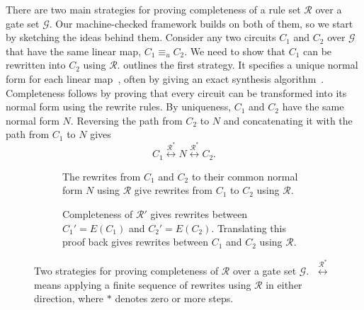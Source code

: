 \documentclass[acmsmall,nonacm,11pt,screen]{acmart}
\newcommand{\tikzfig}[1]{{\tikzstyle{every picture}=[tikzfig]}}
\newcommand{\rewrites}[1]{\overset{#1^{*}}{\longleftrightarrow}}
\begin{document}
There are two main strategies for proving completeness of a rule set $\mathcal{R}$ over a gate set $\mathcal{G}$. Our machine-checked framework builds on both of them, so we start by sketching the ideas behind them. Consider any two circuits $C_1$ and $C_2$ over $\mathcal{G}$ that have the same linear map, $C_1\equiv_{u}C_2$. We need to show that $C_1$ can be rewritten into $C_2$ using $\mathcal{R}$.  outlines the first strategy. It specifies a unique normal form for each linear map~\cite{lafont2003boolean,sakashita2013cnot,feng2026complete,feng2026ancillas,selinger2015clifford,bian2026qupit,makary2021real,amy2018cnotdihedral,blake2026phaseaffine,li2025qutrit}, often by giving an exact synthesis algorithm~\cite{greylyn2014,bian2021un,li2021on,fang2026hadamard,clement2019thesis}. Completeness follows by proving that every circuit can be transformed into its normal form using the rewrite rules. By uniqueness, $C_1$ and $C_2$ have the same normal form $N$. Reversing the path from $C_2$ to $N$ and concatenating it with the path from $C_1$ to $N$ gives
\[
C_1\rewrites{\mathcal{R}}N\rewrites{\mathcal{R}}C_2.
\]

\vspace{-.2 cm}

\begin{figure}[H]
\centering
\begin{subfigure}[b]{0.42\linewidth}
  \centering
  \scalebox{.8}{\tikzfig{planqc/figures/normalform}}
  \caption{The rewrites from $C_1$ and $C_2$ to their common normal form $N$ using $\mathcal{R}$ give rewrites from $C_1$ to $C_2$ using $\mathcal{R}$.}
  \label{fig:normalform}
\end{subfigure}\hfill
\begin{subfigure}[b]{0.52\linewidth}
  \centering
  \scalebox{.8}{\tikzfig{planqc/figures/translation}}
  \caption{Completeness of $\mathcal{R}'$ gives rewrites between $C_1'=E(C_1)$ and $C_2'=E(C_2)$. Translating this proof back gives rewrites between $C_1$ and $C_2$ using $\mathcal{R}$.}
  \label{fig:translation}
\end{subfigure}
\vspace{-.2 cm}
\caption{Two strategies for proving completeness of $\mathcal{R}$ over a gate set $\mathcal{G}$. $\;\rewrites{\mathcal{R}}\;$ means applying a finite sequence of rewrites using $\mathcal{R}$ in either direction, where $*$ denotes zero or more steps.}
\label{fig:strategies}
\end{figure}
\end{document}

